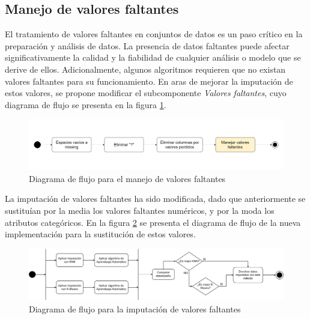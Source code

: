 \subsection{Manejo de valores faltantes}
El tratamiento de valores faltantes en conjuntos de datos es un paso crítico en la preparación y análisis de datos. La presencia de datos faltantes puede afectar significativamente la calidad y la fiabilidad de cualquier análisis o modelo que se derive de ellos. Adicionalmente, algunos algoritmos requieren que no existan valores faltantes para su funcionamiento. En aras de mejorar la imputación de estos valores, se propone modificar el subcomponente \textit{Valores faltantes}, cuyo diagrama de flujo se presenta en la figura \ref{fig:valores-faltantes}.

\begin{figure}[H]
	\centering
	\includegraphics[width=1\linewidth]{"figuras/capi 2/preprocesado/valores faltantes.drawio"}
	\caption{Diagrama de flujo para el manejo de valores faltantes}
	\label{fig:valores-faltantes}
\end{figure}

La imputación de valores faltantes ha sido modificada, dado que anteriormente se sustituían por la media los valores faltantes numéricos, y por la moda los atributos categóricos. En la figura \ref{fig:mv-imputation} se presenta el diagrama de flujo de la nueva implementación para la sustitución de estos valores. 

\begin{figure}[H]
	\centering
	\includegraphics[width=1\linewidth]{"figuras/capi 2/preprocesado/mv imputation.drawio"}
	\caption{Diagrama de flujo para la imputación de valores faltantes}
	\label{fig:mv-imputation}
\end{figure}

